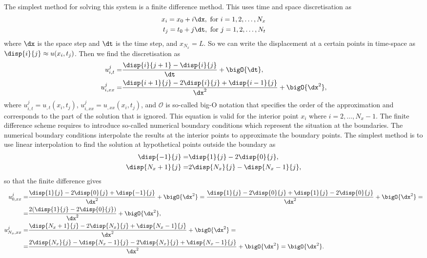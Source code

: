 \documentclass[twoside,a4paper,12pt]{article}
\begin{document}
The simplest method for solving this system is a finite difference
method. This uses time and space discretisation as
%
\begin{subequations}
  \begin{align}
    x_i = x_0 + i\dx, \text{ for } i = 1, 2, \dots, N_x \\
    t_j = t_0 + j\dt, \text{ for } j = 1, 2, \dots, N_t
  \end{align} \label{eq:discr}
\end{subequations}
%
where $\dx$ is the space step and $\dt$ is the time step, and $x_{N_x} = L$.  So we can
write the displacement at a certain points in time-space as
$\disp{i}{j} \approx u(x_i,t_j)$. Then we find the discretisation as
%
\begin{subequations}
  \begin{align}
    u_{i,t}^j  =& \frac{\disp{i}{j+1} - \disp{i}{j}}{\dt} + \bigO{\dt}, \\
    u_{i,xx}^j =& \frac{\disp{i+1}{j} - 2\disp{i}{j} + \disp{i-1}{j}}{\dx^2} + \bigO{\dx^2},
  \end{align}\label{eq:fin-diff}
\end{subequations}
%
where $u_{i,t}^j = u_{,t}(x_i,t_j)$, $u_{i,xx}^j = u_{,xx}(x_i,t_j)$,
and $\mathcal{O}$ is so-called big-O notation that specifies the order
of the approximation and corresponds to the part of the solution that
is ignored. This equation is valid for the interior point $x_i$ where
$i = 2,\dots, N_x-1$. The finite difference scheme requires to
introduce so-called numerical boundary conditions which represent the
situation at the boundaries. The numerical boundary conditions
interpolate the results at the interior points to approximate the
boundary points. The simplest method is to use linear interpolation to
find the solution at hypothetical points outside the boundary as
%
\begin{subequations}
\begin{align}
  \disp{-1}{j} =& \disp{1}{j} - 2\disp{0}{j}, \\
  \disp{N_x+1}{j} =& 2\disp{N_x}{j} - \disp{N_x-1}{j},
\end{align}
\end{subequations}
%
so that the finite difference gives
%
\begin{align}
  u_{0,xx}^j =& \frac{\disp{1}{j} - 2\disp{0}{j} + \disp{-1}{j}}{\dx^2} + \bigO{\dx^2} =
  \frac{\disp{1}{j} - 2\disp{0}{j} + \disp{1}{j} - 2\disp{0}{j}}{\dx^2} + \bigO{\dx^2} =\nonumber \\
  =&\frac{2(\disp{1}{j} - 2\disp{0}{j})}{\dx^2} + \bigO{\dx^2},
  \\
  u_{N_x,xx}^j =& \frac{\disp{N_x+1}{j} - 2\disp{N_x}{j} + \disp{N_x-1}{j}}{\dx^2} + \bigO{\dx^2} =\nonumber \\
  =&\frac{2\disp{N_x}{j} - \disp{N_x-1}{j} - 2\disp{N_x}{j} + \disp{N_x-1}{j}}{\dx^2} + \bigO{\dx^2} = \bigO{\dx^2}.
     \label{eq:error-bigO}
\end{align}
\end{document}
